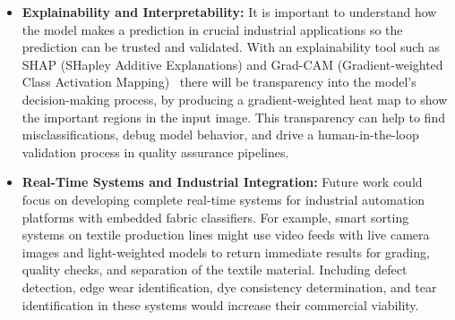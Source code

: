\begin{itemize}
    \item \textbf{Explainability and Interpretability:} It is important to understand how the model makes a prediction in crucial industrial applications so the prediction can be trusted and validated. With an explainability tool such as SHAP (SHapley Additive Explanations) and Grad-CAM (Gradient-weighted Class Activation Mapping)~\cite{selvaraju2017grad} there will be transparency into the model’s decision-making process, by producing a gradient-weighted heat map to show the important regions in the input image. This transparency can help to find misclassifications, debug model behavior, and drive a human-in-the-loop validation process in quality assurance pipelines.

    \item \textbf{Real-Time Systems and Industrial Integration:} Future work could focus on developing complete real-time systems for industrial automation platforms with embedded fabric classifiers. For example, smart sorting systems on textile production lines might use video feeds with live camera images and light-weighted models to return immediate results for grading, quality checks, and separation of the textile material. Including defect detection, edge wear identification, dye consistency determination, and tear identification in these systems would increase their commercial viability.
\end{itemize}
